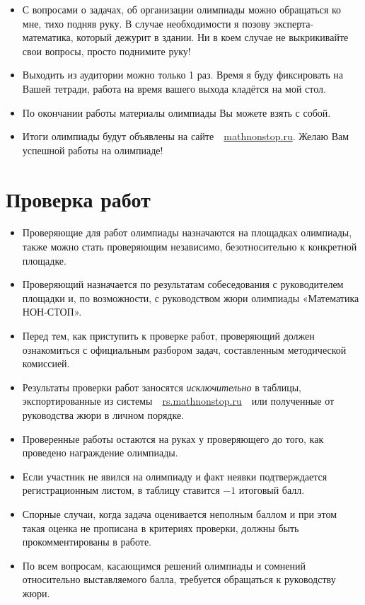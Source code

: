\documentclass[a4paper,12pt]{article}
\newcommand{\mns}{«Математика НОН-СТОП»\xspace}
\begin{document}
\begin{itemize}
	\item С вопросами о задачах, об организации олимпиады можно обращаться ко мне, тихо подняв руку. В случае необходимости я позову эксперта-математика, который дежурит в здании.  Ни в коем случае не выкрикивайте свои вопросы, просто поднимите руку!
	\item Выходить из аудитории можно только 1 раз. Время я буду фиксировать на Вашей тетради, работа на время вашего выхода кладётся на мой стол.
	\item По окончании работы материалы олимпиады Вы можете взять с собой.
	\item Итоги олимпиады будут объявлены на сайте\ \ \url{mathnonstop.ru}. Желаю Вам успешной работы на олимпиаде!
\end{itemize}

\section{Проверка работ}

\begin{itemize}
	\item Проверяющие для работ олимпиады назначаются на площадках олимпиады, также можно стать проверяющим независимо, безотносительно к конкретной площадке.
	\item Проверяющий назначается по результатам собеседования с руководителем площадки и, по возможности, с руководством жюри олимпиады \mns.
	\item Перед тем, как приступить к проверке работ, проверяющий должен ознакомиться с официальным разбором задач, составленным методической комиссией.
	\item Результаты проверки работ заносятся {\it исключительно} в таблицы, экспортированные из системы\ \ \url{rs.mathnonstop.ru}\ \ или полученные от руководства жюри в личном порядке.
	\item Проверенные работы остаются на руках у проверяющего до того, как проведено награждение олимпиады.
	\item Если участник не явился на олимпиаду и факт неявки подтверждается регистрационным листом, в таблицу ставится $-1$ итоговый балл.
	\item Спорные случаи, когда задача оценивается неполным баллом и при этом такая оценка не прописана в критериях проверки, должны быть прокомментированы в работе.
	\item По всем вопросам, касающимся решений олимпиады и сомнений относительно выставляемого балла, требуется обращаться к руководству жюри.
\end{itemize}
\end{document}
